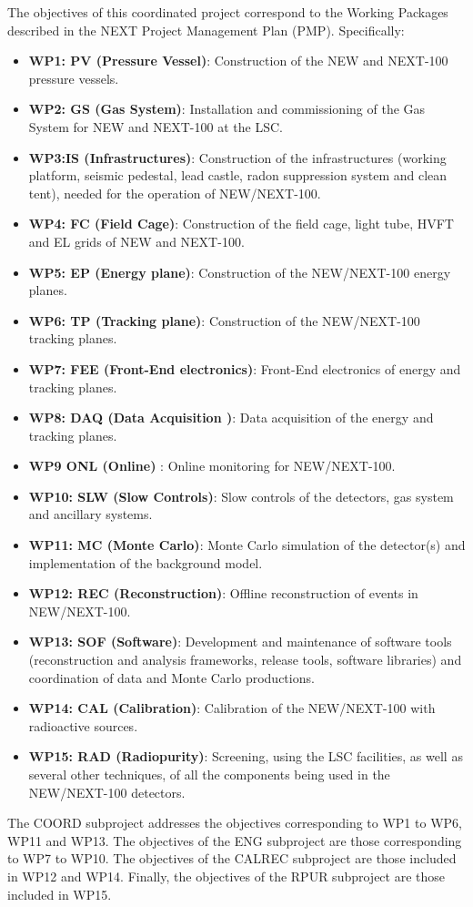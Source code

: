 The objectives of this coordinated project correspond to the Working Packages described in the NEXT Project Management Plan (PMP). Specifically: 
\begin{itemize}
\item {\bf WP1: PV (Pressure Vessel)}: Construction of the NEW and NEXT-100 pressure vessels. 
\item {\bf WP2: GS (Gas System)}: Installation and commissioning of the Gas System for NEW and NEXT-100 at the LSC. 
\item {\bf WP3:IS (Infrastructures)}: Construction of the infrastructures (working platform, seismic pedestal, lead castle, radon suppression system and clean tent), needed for the operation of NEW/NEXT-100.
\item {\bf WP4: FC (Field Cage)}: Construction of the field cage, light tube, HVFT and EL grids of NEW and NEXT-100.
\item {\bf WP5: EP (Energy plane)}: Construction of the NEW/NEXT-100 energy planes.
\item {\bf WP6: TP (Tracking plane)}: Construction of the NEW/NEXT-100 tracking planes.
\item {\bf WP7: FEE (Front-End electronics)}: Front-End electronics of energy and tracking planes.
\item {\bf WP8: DAQ (Data Acquisition )}: Data  acquisition of the energy and tracking planes.
\item {\bf WP9 ONL (Online) }: Online monitoring for NEW/NEXT-100. 
\item {\bf WP10: SLW (Slow Controls)}: Slow controls of the detectors, gas system and ancillary systems.
\item {\bf WP11: MC (Monte Carlo)}: Monte Carlo simulation of the detector(s) and implementation of the background model. 
\item {\bf WP12: REC (Reconstruction)}: Offline reconstruction of events in NEW/NEXT-100.
\item {\bf WP13: SOF (Software)}: Development and maintenance of software tools (reconstruction and analysis frameworks, release tools, software libraries) and coordination of data and Monte Carlo productions. 
\item {\bf WP14: CAL (Calibration)}: Calibration of the NEW/NEXT-100 with radioactive sources. 
\item {\bf WP15: RAD (Radiopurity)}: Screening, using the LSC facilities, as well as several other techniques, of all the components being used in the  NEW/NEXT-100 detectors. 
\end{itemize}

The COORD subproject addresses the objectives corresponding to WP1 to WP6, WP11 and WP13. The objectives of the ENG subproject are those corresponding to WP7 to WP10. The objectives of the CALREC subproject are those included in WP12 and WP14. Finally, the objectives of the RPUR subproject are those included in WP15.  
